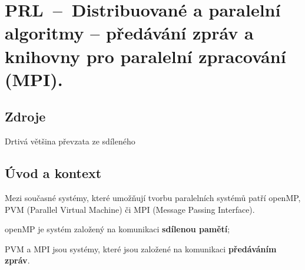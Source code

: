 

\graphicspath{{prl/paralelni_algoritmy_predavani_zprav/figures}}


\chapter{PRL~--~Distribuované a paralelní algoritmy -- předávání zpráv a knihovny pro paralelní zpracování (MPI).}


\section{Zdroje}

\begin{compactitem}
    \item Drtivá většina převzata ze sdíleného 
    \item {}
\end{compactitem}


\section{Úvod a kontext}

\begin{compactitem}
    \item Mezi současné systémy, které umožňují tvorbu paralelních systémů patří openMP, PVM (Parallel Virtual Machine) či MPI (Message Passing Interface). \begin{compactitem}
        \item openMP je systém založený na komunikaci \textbf{sdílenou pamětí};
        \item PVM a MPI jsou systémy, které jsou založené na komunikaci \textbf{předáváním zpráv}.
    \end{compactitem}
\end{compactitem}


